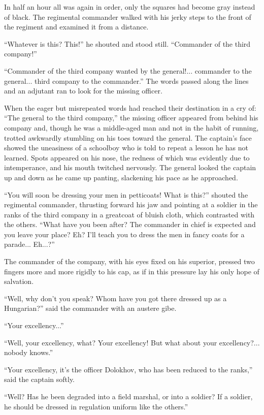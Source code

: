 In half an hour all was again in order, only the squares had
become gray instead of black. The regimental commander walked
with his jerky steps to the front of the regiment and examined it
from a distance.

``Whatever is this? This!'' he shouted and stood
still. ``Commander of the third company!''

``Commander of the third company wanted by the
general!... commander to the general... third company to the
commander.'' The words passed along the lines and an adjutant ran
to look for the missing officer.

When the eager but misrepeated words had reached their
destination in a cry of: ``The general to the third company,''
the missing officer appeared from behind his company and, though
he was a middle-aged man and not in the habit of running, trotted
awkwardly stumbling on his toes toward the general. The captain's
face showed the uneasiness of a schoolboy who is told to repeat a
lesson he has not learned. Spots appeared on his nose, the
redness of which was evidently due to intemperance, and his mouth
twitched nervously. The general looked the captain up and down as
he came up panting, slackening his pace as he approached.

``You will soon be dressing your men in petticoats! What is
this?''  shouted the regimental commander, thrusting forward his
jaw and pointing at a soldier in the ranks of the third company
in a greatcoat of bluish cloth, which contrasted with the
others. ``What have you been after? The commander in chief is
expected and you leave your place? Eh? I'll teach you to dress
the men in fancy coats for a parade... Eh...?''

The commander of the company, with his eyes fixed on his
superior, pressed two fingers more and more rigidly to his cap,
as if in this pressure lay his only hope of salvation.

``Well, why don't you speak? Whom have you got there dressed up
as a Hungarian?'' said the commander with an austere gibe.

``Your excellency...''

``Well, your excellency, what? Your excellency! But what about
your excellency?... nobody knows.''

``Your excellency, it's the officer Dolokhov, who has been
reduced to the ranks,'' said the captain softly.

``Well? Has he been degraded into a field marshal, or into a
soldier? If a soldier, he should be dressed in regulation uniform
like the others.''

